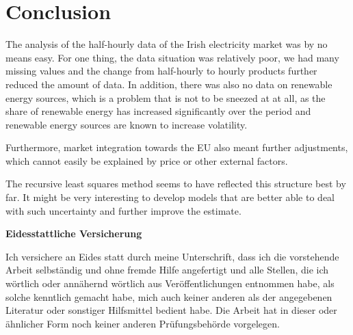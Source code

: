 \documentclass[12pt,a4paper]{article}
\begin{document}
\hypertarget{conclusion}{%
\section{Conclusion}\label{conclusion}}

The analysis of the half-hourly data of the Irish electricity market was
by no means easy. For one thing, the data situation was relatively poor,
we had many missing values and the change from half-hourly to hourly
products further reduced the amount of data. In addition, there was also
no data on renewable energy sources, which is a problem that is not to
be sneezed at at all, as the share of renewable energy has increased
significantly over the period and renewable energy sources are known to
increase volatility.

Furthermore, market integration towards the EU also meant further
adjustments, which cannot easily be explained by price or other external
factors.

The recursive least squares method seems to have reflected this
structure best by far. It might be very interesting to develop models
that are better able to deal with such uncertainty and further improve
the estimate.

\newpage

\newpage
\textbf{Eidesstattliche Versicherung}

\bigskip

Ich versichere an Eides statt durch meine Unterschrift, dass ich die vorstehende Arbeit selbständig und ohne fremde Hilfe angefertigt und alle Stellen, die ich wörtlich oder annähernd wörtlich aus Veröffentlichungen entnommen habe, als solche kenntlich gemacht habe, mich auch keiner anderen als der angegebenen Literatur oder sonstiger Hilfsmittel bedient habe. Die Arbeit hat in dieser oder ähnlicher Form noch keiner anderen Prüfungsbehörde vorgelegen.

\vspace{1cm}
\rule{0pt}{2\baselineskip} %
\par\noindent{} \hfill\makebox[2.25in]{\hrulefill}%
\par\noindent\makebox[2.25in][l]{} \hfill{}%
\end{document}
